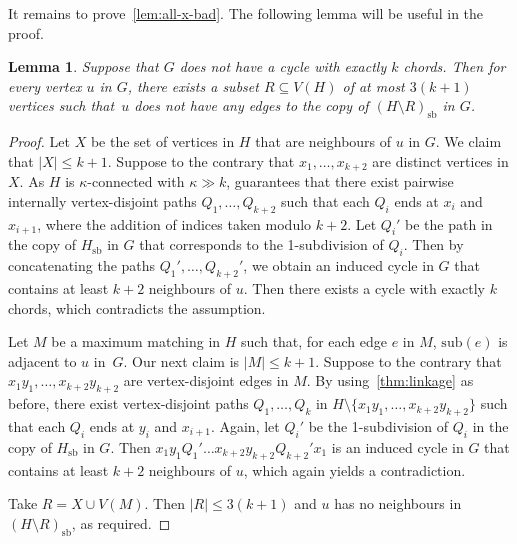 \documentclass[11pt,english]{article}
\theoremstyle{plain}
\newtheorem{lem}[thm]{Lemma}
\theoremstyle{definition}
\theoremstyle{remark}
\newcommand{\sub}{\mathrm{sub}}
\newcommand{\sbb}{\mathrm{sb}}
\begin{document}
    It remains to prove~\cref{lem:all-x-bad}. The following lemma will be useful in the proof.
		
		\begin{lem} \label{claim:neighbours-Hs}
			Suppose that $G$ does not have a cycle with exactly $k$ chords. 
			Then for every vertex $u$ in $G$, there exists a subset $R\subseteq V(H)$ of at most $3(k+1)$ vertices such that~$u$ does not have any edges to the copy of $(H \setminus R)_\sbb$ in $G$.
		\end{lem}

		\begin{proof}
			Let $X$ be the set of vertices in $H$ that are neighbours of $u$ in $G$. We claim that $|X| \le k+1$. Suppose to the contrary that $x_1, \ldots, x_{k+2}$ are distinct vertices in $X$. 
			As $H$ is $\kappa$-connected with $\kappa \gg k$,  guarantees that there exist pairwise internally vertex-disjoint paths $Q_1, \ldots, Q_{k+2}$ such that each $Q_i$ ends at $x_i$ and $x_{i+1}$, where the addition of indices taken modulo $k+2$.
			Let $Q_i'$ be the path in the copy of $H_\sbb$ in $G$ that corresponds to the 1-subdivision of $Q_i$.
			Then by concatenating the paths $Q_1', \ldots , Q_{k+2}'$, we obtain an induced cycle in $G$ that contains at least $k+2$ neighbours of $u$. 
			Then there exists a cycle with exactly $k$ chords, which contradicts the assumption.

			Let $M$ be a maximum matching in $H$ such that, for each edge $e$ in $M$, $\sub(e)$ is adjacent to $u$ in~$G$. 
			Our next claim is $|M| \le k+1$. Suppose to the contrary that $x_1 y_1, \ldots, x_{k+2} y_{k+2}$ are vertex-disjoint edges in $M$. 
			By using~\cref{thm:linkage} as before, there exist vertex-disjoint paths $Q_1, \ldots, Q_k$ in $H \setminus \{x_1 y_1, \ldots, x_{k+2} y_{k+2}\}$ such that each $Q_i$ ends at $y_i$ and $x_{i+1}$.
			Again, let $Q_i'$ be the 1-subdivision of $Q_i$ in the copy of $H_\sbb$ in $G$.
			Then $x_1 y_1 Q_1' \ldots x_{k+2} y_{k+2} Q_{k+2}'x_1$ is an induced cycle in $G$ that contains at least $k+2$ neighbours of $u$, which again yields a contradiction.

			Take $R = X \cup V(M)$. Then $|R| \le 3(k+1)$ and $u$ has no neighbours in $(H \setminus R)_\sbb$, as required.
		\end{proof}
\end{document}
